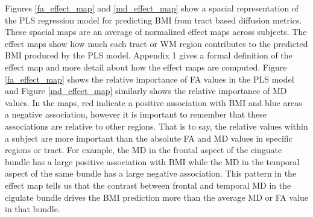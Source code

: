 	Figures \ref{fa_effect_map} and \ref{md_effect_map} show a spacial representation of the PLS regression model for predicting BMI from tract based diffusion metrics. These spacial maps are an average of normalized effect maps across subjects. The effect maps show how much each tract or WM region contributes to the predicted BMI produced by the PLS model. Appendix 1 gives a formal definition of the effect map and more detail about how the effect maps are computed. Figure \ref{fa_effect_map} shows the relative importance of FA values in the PLS model and Figure \ref{md_effect_map} similarly shows the relative importance of MD values. In the maps, red indicate a positive association with BMI and blue areas a negative association, however it is important to remember that these associations are relative to other regions. That is to say, the relative values within a subject are more important than the absolute FA and MD values in specific regions or tract. For example, the MD in the frontal aspect of the cinguate bundle has a large positive association with BMI while the MD in the temporal aspect of the same bundle has a large negative association. This pattern in the effect map tells us that the contrast between frontal and temporal MD in the cigulate bundle drives the BMI  prediction more than the average MD or FA value in that bundle.
	